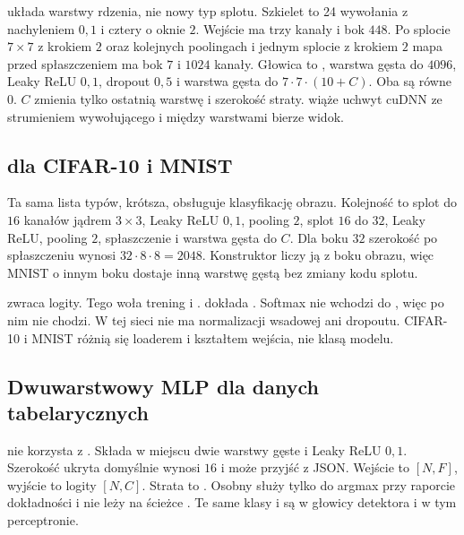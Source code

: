  układa warstwy rdzenia, nie nowy typ splotu. Szkielet to 24 wywołania  z nachyleniem \(0{,}1\) i cztery  o oknie \(2\). Wejście ma trzy kanały i bok \(448\). Po splocie \(7\times 7\) z krokiem \(2\) oraz kolejnych poolingach i jednym splocie z krokiem \(2\) mapa przed spłaszczeniem ma bok \(7\) i \(1024\) kanały. Głowica to , warstwa gęsta do \(4096\), Leaky ReLU \(0{,}1\), dropout \(0{,}5\) i warstwa gęsta do \(7\cdot 7\cdot(10+C)\). Oba  są równe \(0\). \(C\) zmienia tylko ostatnią warstwę i szerokość straty.  wiąże uchwyt cuDNN ze strumieniem wywołującego i między warstwami bierze widok.

\subsection{ dla CIFAR-10 i MNIST}

Ta sama lista typów, krótsza, obsługuje klasyfikację obrazu. Kolejność to splot do \(16\) kanałów jądrem \(3\times 3\), Leaky ReLU \(0{,}1\), pooling \(2\), splot \(16\) do \(32\), Leaky ReLU, pooling \(2\), spłaszczenie i warstwa gęsta do \(C\). Dla boku \(32\) szerokość po spłaszczeniu wynosi \(32\cdot 8\cdot 8 = 2048\). Konstruktor liczy ją z boku obrazu, więc MNIST o innym boku dostaje inną warstwę gęstą bez zmiany kodu splotu.

 zwraca logity. Tego woła trening i .  dokłada . Softmax nie wchodzi do , więc  po nim nie chodzi. W tej sieci nie ma normalizacji wsadowej ani dropoutu. CIFAR-10 i MNIST różnią się loaderem i kształtem wejścia, nie klasą modelu.

\subsection{Dwuwarstwowy MLP dla danych tabelarycznych}

 nie korzysta z . Składa w miejscu dwie warstwy gęste i Leaky ReLU \(0{,}1\). Szerokość ukryta domyślnie wynosi \(16\) i może przyjść z JSON. Wejście to \([N, F]\), wyjście to logity \([N, C]\). Strata to . Osobny  służy tylko do argmax przy raporcie dokładności i nie leży na ścieżce . Te same klasy  i  są w głowicy detektora i w tym perceptronie.

